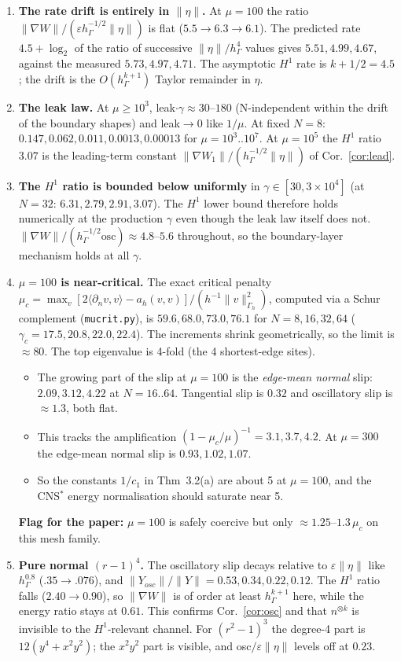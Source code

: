 \documentclass[11pt]{article}
\theoremstyle{remark}
\newcommand{\hG}{h_\Gamma}
\newcommand{\Gh}{\Gamma_h}
\newcommand{\ip}[2]{\langle #1,#2\rangle}
\begin{document}
\begin{enumerate}
\item[N1] \textbf{The rate drift is entirely in $\|\eta\|$.} At $\mu=100$ the ratio $\|\nabla W\|/(\varepsilon\hG^{-1/2}\|\eta\|)$
is flat ($5.5\to6.3\to6.1$). The predicted rate $4.5+\log_2$ of the ratio of successive $\|\eta\|/\hG^4$ values gives
$5.51,4.99,4.67$, against the measured $5.73,4.97,4.71$. The asymptotic $H^1$ rate is $k+1/2=4.5$; the drift is the
$O(\hG^{k+1})$ Taylor remainder in $\eta$.
\item[N2] \textbf{The leak law.} At $\mu\ge10^3$, leak$\cdot\gamma\approx30$--$180$ (N-independent within the drift of the
boundary shapes) and leak$\to0$ like $1/\mu$. At fixed $N=8$: $0.147,0.062,0.011,0.0013,0.00013$ for $\mu=10^3..10^7$.
At $\mu=10^5$ the $H^1$ ratio $3.07$ is the leading-term constant $\|\nabla W_1\|/(\hG^{-1/2}\|\eta\|)$ of
Cor.~\ref{cor:lead}.
\item[N3] \textbf{The $H^1$ ratio is bounded below uniformly} in $\gamma\in[30,3\times10^4]$ (at $N=32$: $6.31,2.79,2.91,3.07$).
The $H^1$ lower bound therefore holds numerically at the production $\gamma$ even though the leak law itself does not.
$\|\nabla W\|/(\hG^{-1/2}\text{osc})\approx4.8$--$5.6$ throughout, so the boundary-layer mechanism holds at all $\gamma$.
\item[N4] \textbf{$\mu=100$ is near-critical.} The exact critical penalty
$\mu_c=\max_v[2\ip{\partial_nv}{v}-a_h(v,v)]/(h^{-1}\|v\|^2_{\Gh})$, computed via a Schur complement
(\texttt{mucrit.py}), is $59.6,68.0,73.0,76.1$ for $N=8,16,32,64$ ($\gamma_c=17.5,20.8,22.0,22.4$). The increments shrink
geometrically, so the limit is $\approx80$. The top eigenvalue is 4-fold (the 4 shortest-edge sites).
\begin{itemize}
\item The growing part of the slip at $\mu=100$ is the \emph{edge-mean normal} slip: $2.09,3.12,4.22$ at $N=16..64$.
Tangential slip is $0.32$ and oscillatory slip is $\approx1.3$, both flat.
\item This tracks the amplification $(1-\mu_c/\mu)^{-1}=3.1,3.7,4.2$. At $\mu=300$ the edge-mean normal slip is
$0.93,1.02,1.07$.
\item So the constants $1/c_1$ in Thm~3.2(a) are about 5 at $\mu=100$, and the CNS$^\ast$ energy normalisation should
saturate near 5.
\end{itemize}
\textbf{Flag for the paper:} $\mu=100$ is safely coercive but only $\approx1.25$--$1.3\,\mu_c$ on this mesh family.
\item[N5] \textbf{Pure normal $(r-1)^4$.} The oscillatory slip decays relative to $\varepsilon\|\eta\|$ like $\hG^{0.8}$
($.35\to.076$), and $\|Y_{osc}\|/\|Y\|=0.53,0.34,0.22,0.12$. The $H^1$ ratio falls ($2.40\to0.90$), so $\|\nabla W\|$ is of
order at least $\hG^{k+1}$ here, while the energy ratio stays at $0.61$. This confirms Cor.~\ref{cor:osc} and that
$n^{\otimes k}$ is invisible to the $H^1$-relevant channel. For $(r^2-1)^3$ the degree-4 part is $12(y^4+x^2y^2)$; the
$x^2y^2$ part is visible, and osc$/\varepsilon\|\eta\|$ levels off at $0.23$.
\end{enumerate}
\end{document}
